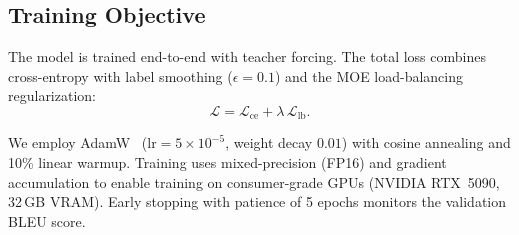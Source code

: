 \subsection{Training Objective}
\label{sec:method:training}

The model is trained end-to-end with teacher forcing. The total loss combines cross-entropy with label smoothing ($\epsilon{=}0.1$) and the MOE load-balancing regularization:
\begin{equation}
    \mathcal{L} = \mathcal{L}_{\mathrm{ce}} + \lambda\,\mathcal{L}_{\mathrm{lb}}.
    \label{eq:total_loss}
\end{equation}

We employ AdamW~\cite{loshchilov2019decoupled} ($\mathrm{lr}{=}5{\times}10^{-5}$, weight decay $0.01$) with cosine annealing and 10\% linear warmup. Training uses mixed-precision (FP16) and gradient accumulation to enable training on consumer-grade GPUs (NVIDIA RTX~5090, 32\,GB VRAM). Early stopping with patience of 5 epochs monitors the validation BLEU score.
